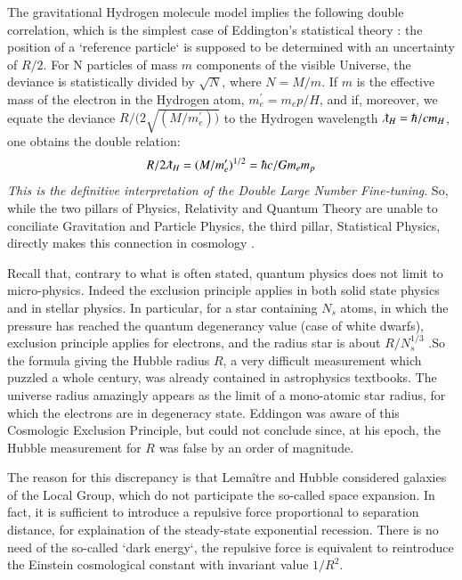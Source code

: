 \documentclass[twoside,draft]{article}
\begin{document}
\begin{sloppypar}
The gravitational Hydrogen molecule model \cite{Sanchez1} implies the following double correlation,
which is the simplest case of Eddington's statistical theory \cite{Eddy}: the position of a `reference particle`
is supposed to be determined with an uncertainty of ${R/2}$. For N particles of mass $m$ components of the visible Universe, the deviance is statistically divided by $\sqrt{N}$, where $N = M/m$. If $m$ is the effective mass of the electron in the Hydrogen atom, $m^{\prime}_{e} = m_{e} p/H$, and if, moreover, we equate
the deviance $R/(2\sqrt{(M/m^{\prime}_{e}))}$ to the Hydrogen wavelength $\lambdabar_{H} = \hbar/c m_{H}$, one obtains the double relation:
\begin{equation}
R/2\lambdabar_{H} = (M/m^{\prime}_{e})^{1/2} = \hbar c/G m_{e} m_{p}
\end{equation}
\textit{This is the definitive interpretation of the Double Large Number Fine-tuning}. So, while the two
pillars of Physics, Relativity and Quantum Theory are unable to conciliate Gravitation and Particle
Physics, the third pillar, Statistical Physics, directly makes this connection in cosmology \cite{Eddy}.

Recall that, contrary to what is often stated, quantum physics does not limit to micro-physics.
Indeed the exclusion principle applies in both solid state physics and in stellar physics. In particular,
for a star containing $N_s$ atoms, in which the pressure has reached the quantum degenerancy value
(case of white dwarfs), exclusion principle applies for electrons, and the radius star is about $R/N_{s}^{1/3}$
\cite{Sanchez1}.So the formula giving the Hubble radius $R$, a very difficult measurement which puzzled a whole
century, was already contained in astrophysics textbooks. The universe radius amazingly appears as
the limit of a mono-atomic star radius, for which the electrons are in degeneracy state. Eddingon was
aware of this Cosmologic Exclusion Principle, but could not conclude since, at his epoch, the
Hubble measurement for $R$ was false by an order of magnitude.

The reason for this discrepancy is that Lema\^itre and Hubble considered galaxies of the Local
Group, which do not participate the so-called space expansion. In fact, it is sufficient to introduce a
repulsive force proportional to separation distance, for explaination of the steady-state
exponential recession. There is no need of the so-called `dark energy`, the repulsive force is equivalent
to reintroduce the Einstein cosmological constant with invariant value $1/R^{2}$. 


\end{sloppypar}
\end{document}
